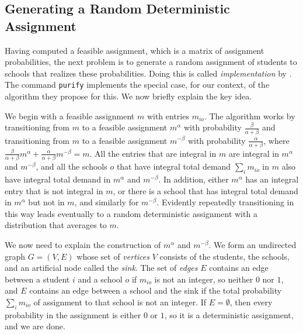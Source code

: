 \documentclass[12pt]{article}
\theoremstyle{definition}
\begin{document}
\subsection{Generating a Random Deterministic Assignment}

Having computed a feasible assignment, which is a matrix of
assignment probabilities, the next problem is to generate a
random assignment of students to schools that realizes these
probabilities.  Doing this is called \emph{implementation} by
\cite{bckm13aer}.  The command \texttt{purify} implements the special
case, for our context, of the algorithm they propose for this.  We now
briefly explain the key idea.

We begin with a feasible assignment $m$ with entries $m_{io}$.  The
algorithm works by transitioning from $m$ to a feasible assignment
$m^\alpha$ with probability $\tfrac{\beta}{\alpha + \beta}$ and
transitioning from $m$ to a feasible assignment $m^{-\beta}$ with
probability $\tfrac{\alpha}{\alpha + \beta}$, where
$\tfrac{\beta}{\alpha + \beta}m^\alpha + \tfrac{\alpha}{\alpha +
  \beta}m^{-\beta} = m$.  All the entries that are integral in $m$ are
integral in $m^\alpha$ and $m^{-\beta}$, and all the schools $o$ that
have integral total demand $\sum_i m_{io}$ in $m$ also have integral
total demand in $m^\alpha$ and $m^{-\beta}$.  In addition, either
$m^\alpha$ has an integral entry that is not integral in $m$, or there
is a school that has integral total demand in $m^\alpha$ but not in
$m$, and similarly for $m^{-\beta}$.  Evidently repeatedly
transitioning in this way leads eventually to a random deterministic
assignment with a distribution that averages to $m$.

We now need to explain the construction of $m^\alpha$ and
$m^{-\beta}$.  We form an undirected graph $G = (V,E)$ whose set of
\emph{vertices} $V$ consists of the students, the schools, and an
artificial node called the \emph{sink}. The set of \emph{edges} $E$
contains an edge between a student $i$ and a school $o$ if $m_{io}$ is
not an integer, so neither $0$ nor $1$, and $E$ contains an edge
between a school and the sink if the total probability $\sum_i m_{io}$
of assignment to that school is not an integer.  If $E = \emptyset$,
then every probability in the assignment is either $0$ or $1$, so it
is a deterministic assignment, and we are done.
\end{document}
